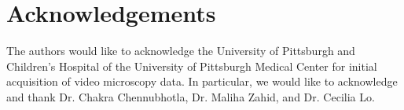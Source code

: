 \section{Acknowledgements}

The authors would like to acknowledge the University of Pittsburgh and Children's Hospital of the University of Pittsburgh Medical Center for initial acquisition of video microscopy data. In particular, we would like to acknowledge and thank Dr. Chakra Chennubhotla, Dr. Maliha Zahid, and Dr. Cecilia Lo.


